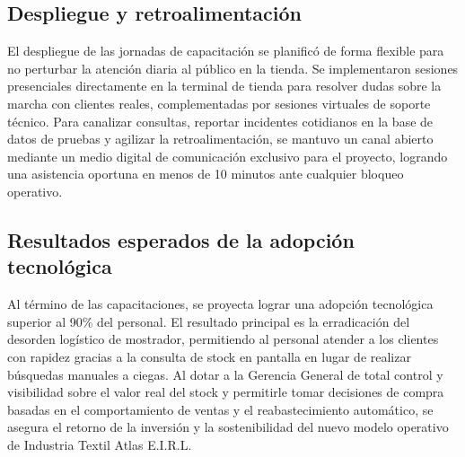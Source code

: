 \subsection{Despliegue y retroalimentación}
\begin{indentedsubsection}
El despliegue de las jornadas de capacitación se planificó de forma flexible para no perturbar la atención diaria al público en la tienda. Se implementaron sesiones presenciales directamente en la terminal de tienda para resolver dudas sobre la marcha con clientes reales, complementadas por sesiones virtuales de soporte técnico. Para canalizar consultas, reportar incidentes cotidianos en la base de datos de pruebas y agilizar la retroalimentación, se mantuvo un canal abierto mediante un medio digital de comunicación exclusivo para el proyecto, logrando una asistencia oportuna en menos de 10 minutos ante cualquier bloqueo operativo.
\end{indentedsubsection}

\subsection{Resultados esperados de la adopción tecnológica}
\begin{indentedsubsection}
Al término de las capacitaciones, se proyecta lograr una adopción tecnológica superior al 90\% del personal. El resultado principal es la erradicación del desorden logístico de mostrador, permitiendo al personal atender a los clientes con rapidez gracias a la consulta de stock en pantalla en lugar de realizar búsquedas manuales a ciegas. Al dotar a la Gerencia General de total control y visibilidad sobre el valor real del stock y permitirle tomar decisiones de compra basadas en el comportamiento de ventas y el reabastecimiento automático, se asegura el retorno de la inversión y la sostenibilidad del nuevo modelo operativo de Industria Textil Atlas E.I.R.L.
\end{indentedsubsection}
